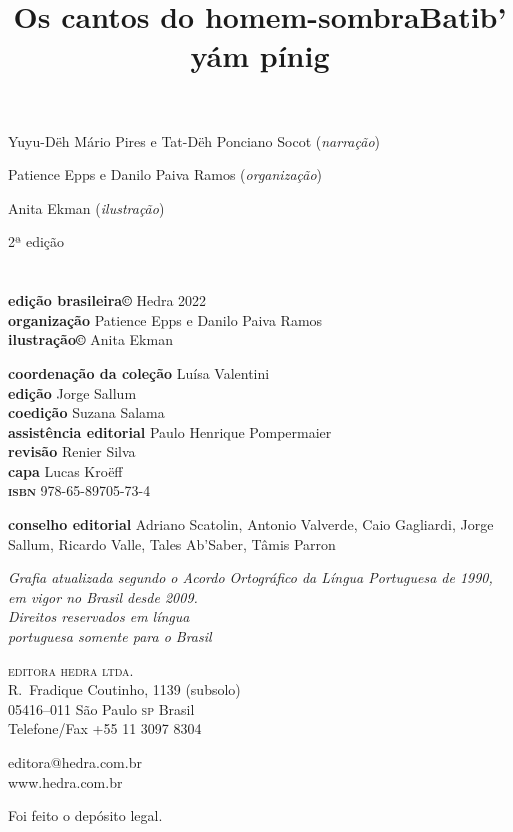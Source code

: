 \title{Os cantos do homem-sombra}

\title{Batib’ yám pínig}



Yuyu-Dëh Mário Pires e Tat-Dëh Ponciano Socot (\textit{narração})

Patience Epps e Danilo Paiva Ramos (\textit{organização})

Anita Ekman (\textit{ilustração})

2ª edição

\chapter{}

\textbf{edição brasileira©} Hedra 2022\\
\textbf{organização} Patience Epps e Danilo Paiva Ramos\\
\textbf{ilustração©} Anita Ekman

\textbf{coordenação da coleção} Luísa Valentini\\
\textbf{edição} Jorge Sallum\\
\textbf{coedição} Suzana Salama\\
\textbf{assistência editorial} Paulo Henrique Pompermaier\\
\textbf{revisão} Renier Silva\\
\textbf{capa} Lucas Kroëff\\

\textbf{\textsc{isbn}} 978-65-89705-73-4

\textbf{conselho editorial} Adriano Scatolin, Antonio Valverde, Caio Gagliardi, Jorge Sallum, Ricardo Valle, Tales Ab'Saber, Tâmis Parron
 
\bigskip
\textit{Grafia atualizada segundo o Acordo Ortográfico da Língua
Portuguesa de 1990, em vigor no Brasil desde 2009.}\\

\vfill
\textit{Direitos reservados em língua\\ 
portuguesa somente para o Brasil}

\textsc{editora hedra ltda.}\\
R.~Fradique Coutinho, 1139 (subsolo)\\
05416--011 São Paulo \textsc{sp} Brasil\\
Telefone/Fax +55 11 3097 8304

editora@hedra.com.br\\
www.hedra.com.br

Foi feito o depósito legal.

